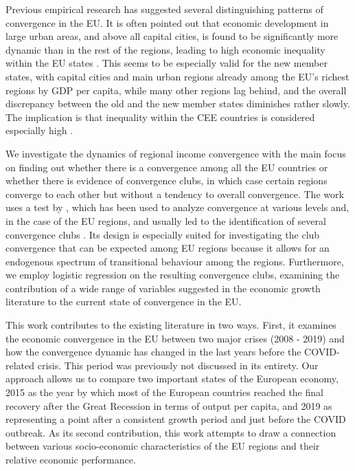 \documentclass[11pt]{article}
\begin{document}
Previous empirical research has suggested several distinguishing patterns of convergence in the EU. It is often pointed out that economic development in large urban areas, and above all capital cities, is found to be significantly more dynamic than in the rest of the regions, leading to high economic inequality within the EU states \citep{geppert2008regional}. This seems to be especially valid for the new member states, with capital cities and main urban regions already among the EU's richest regions by GDP per capita, while many other regions lag behind, and the overall discrepancy between the old and the new member states diminishes rather slowly. The implication is that inequality within the CEE countries is considered especially high \citep{geppert2008regional,sme2012regional, smketkowski2013regional}.


We investigate the dynamics of regional income convergence with the main focus on finding out whether there is a convergence among all the EU countries or whether there is evidence of convergence clubs, in which case certain regions converge to each other but without a tendency to overall convergence. The work uses a test by \citet{phillips2007transition}, which has been used to analyze convergence at various levels and, in the case of the EU regions, and usually led to the identification of several convergence clubs \citep{bartkowska2012regional, borsi2015evolution, von2017regional}. Its design is especially suited for investigating the club convergence that can be expected among EU regions because it allows for an endogenous spectrum of transitional behaviour among the regions. Furthermore, we employ logistic regression on the resulting convergence clubs, examining the contribution of a wide range of variables suggested in the economic growth literature to the current state of convergence in the EU.

This work contributes to the existing literature in two ways. First, it examines the economic convergence in the EU between two major crises (2008 - 2019) and how the convergence dynamic has changed in the last years before the COVID-related crisis. This period was previously not discussed in its entirety. Our approach allows us to compare two important states of the European economy, 2015 as the year by which most of the European countries reached the final recovery after the Great Recession in terms of output per capita, and 2019 as representing a point after a consistent growth period and just before the COVID outbreak. As its second contribution, this work attempts to draw a connection between various socio-economic characteristics of the EU regions and their relative economic performance.
\end{document}
